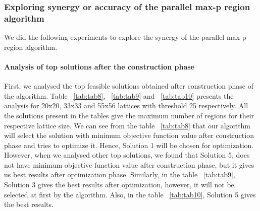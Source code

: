 \documentclass[conference]{IEEEtran}
\begin{document}


\subsubsection{\textbf{Exploring synergy or accuracy of the parallel max-p region algorithm}}

We did the following experiments to explore the synergy of the parallel max-p region algorithm. 

\paragraph{Analysis of top solutions after the construction phase}
First, we analysed the top feasible solutions obtained after construction phase of the algorithm. Table ~\ref{tab:tab8}, ~\ref{tab:tab9} and ~\ref{tab:tab10} presents the analysis for 20x20, 33x33 and 55x56 lattices with threshold 25 respectively. All the solutions present in the tables give the maximum number of regions for their respective lattice size. We can see from the table ~\ref{tab:tab8} that our algorithm will select the solution with minimum objective function value after construction phase and tries to optimize it. Hence, Solution 1 will be chosen for optimization. However, when we analysed other top solutions, we found that Solution 5, does not have minimum objective function value after construction phase, but it gives us best results after optimization phase. Similarly, in the table ~\ref{tab:tab9}, Solution 3 gives the best results after optimization, however, it will not be selected at first by the algorithm. Also, in the table ~\ref{tab:tab10}, Solution 5 gives the best results.
\end{document}
